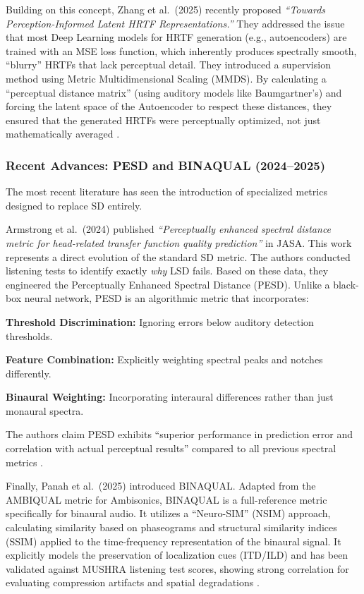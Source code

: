 \documentclass[12pt,a4paper]{article}
\begin{document}
Building on this concept, Zhang et al.\ (2025) \cite{zhang2025} recently proposed \textit{``Towards Perception-Informed Latent HRTF Representations.''} They addressed the issue that most Deep Learning models for HRTF generation (e.g., autoencoders) are trained with an MSE loss function, which inherently produces spectrally smooth, ``blurry'' HRTFs that lack perceptual detail. They introduced a supervision method using Metric Multidimensional Scaling (MMDS). By calculating a ``perceptual distance matrix'' (using auditory models like Baumgartner's) and forcing the latent space of the Autoencoder to respect these distances, they ensured that the generated HRTFs were perceptually optimized, not just mathematically averaged \cite{zhang2025}.

\subsubsection{Recent Advances: PESD and BINAQUAL (2024--2025)}

The most recent literature has seen the introduction of specialized metrics designed to replace SD entirely.

Armstrong et al.\ (2024) \cite{armstrong2024} published \textit{``Perceptually enhanced spectral distance metric for head-related transfer function quality prediction''} in JASA. This work represents a direct evolution of the standard SD metric. The authors conducted listening tests to identify exactly \textit{why} LSD fails. Based on these data, they engineered the Perceptually Enhanced Spectral Distance (PESD). Unlike a black-box neural network, PESD is an algorithmic metric that incorporates:

\textbf{Threshold Discrimination:} Ignoring errors below auditory detection thresholds.

\textbf{Feature Combination:} Explicitly weighting spectral peaks and notches differently.

\textbf{Binaural Weighting:} Incorporating interaural differences rather than just monaural spectra.

The authors claim PESD exhibits ``superior performance in prediction error and correlation with actual perceptual results'' compared to all previous spectral metrics \cite{armstrong2024}.

Finally, Panah et al.\ (2025) \cite{panah2025} introduced BINAQUAL. Adapted from the AMBIQUAL metric for Ambisonics, BINAQUAL is a full-reference metric specifically for binaural audio. It utilizes a ``Neuro-SIM'' (NSIM) approach, calculating similarity based on phaseograms and structural similarity indices (SSIM) applied to the time-frequency representation of the binaural signal. It explicitly models the preservation of localization cues (ITD/ILD) and has been validated against MUSHRA listening test scores, showing strong correlation for evaluating compression artifacts and spatial degradations \cite{panah2025}.
\end{document}
